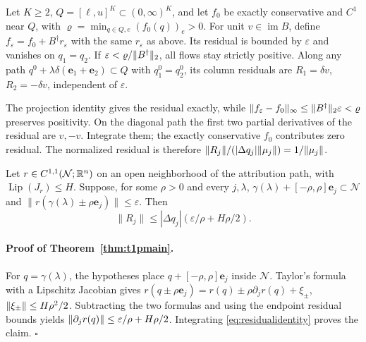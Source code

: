 \begin{proposition}\label{prop:positive}
Let $K\ge2$, $Q=[\ell,u]^K\subset(0,\infty)^K$, and let $f_0$ be
exactly conservative and $C^1$ near $Q$, with
$\varrho=\min_{q\in Q,e}(f_0(q))_e>0$. For unit
$v\in\operatorname{im}B$, define
$f_\varepsilon=f_0+B^\dagger r_\varepsilon$ with the same
$r_\varepsilon$ as above. Its residual is bounded by $\varepsilon$
and vanishes on $q_1=q_2$. If
$\varepsilon<\varrho/\lVert B^\dagger \rVert_2$, all flows stay strictly
positive. Along any path
$q^0+\lambda\delta(\mathbf e_1+\mathbf e_2)\subset Q$ with
$q^0_1=q^0_2$, its column residuals are $R_1=\delta v$,
$R_2=-\delta v$, independent of $\varepsilon$.
\end{proposition}
\begin{pf}
The projection identity gives the residual exactly, while
$\lVert f_\varepsilon-f_0 \rVert_\infty\le
\lVert B^\dagger \rVert_2\varepsilon<\varrho$ preserves positivity.
On the diagonal path the first two partial derivatives of the
residual are $v,-v$. Integrate them; the exactly conservative
$f_0$ contributes zero residual. The normalized residual is therefore
$\lVert R_j \rVert/(|\Delta q_j|\lVert \mu_j \rVert)=1/\lVert \mu_j \rVert$.
\end{pf}

\begin{theorem}\label{thm:t1pmain}
Let $r\in C^{1,1}(\mathcal N;\mathbb{R}^n)$ on an open neighborhood of the
attribution path, with $\operatorname{Lip}(J_r)\le H$.
Suppose, for some $\rho>0$ and every $j,\lambda$,
$\gamma(\lambda)+[-\rho,\rho]\mathbf e_j\subset\mathcal N$ and
$\|r(\gamma(\lambda)\pm\rho\mathbf e_j)\|\le\varepsilon$.
Then
\[
\|R_j\|\le|\Delta q_j|(\varepsilon/\rho+H\rho/2).
\]
\end{theorem}
\paragraph{Proof of Theorem~\ref{thm:t1pmain}.}\label{app:stencil}
For $q=\gamma(\lambda)$, the hypotheses place
$q+[-\rho,\rho]\mathbf e_j$ inside $\mathcal N$. Taylor's formula with a
Lipschitz Jacobian gives
$r(q\pm\rho\mathbf e_j)=r(q)\pm\rho\partial_jr(q)+\xi_\pm$,
$\lVert \xi_\pm \rVert\le H\rho^2/2$. Subtracting the two formulas and
using the endpoint residual bounds yields
$\lVert \partial_jr(q) \rVert\le\varepsilon/\rho+H\rho/2$.
Integrating \eqref{eq:residualidentity} proves the claim.
\hfill$\square$

